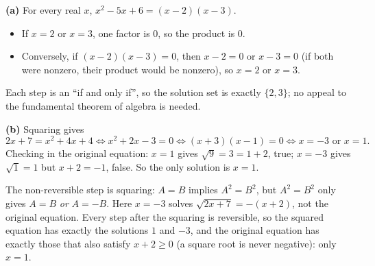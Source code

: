 \textbf{(a)} For every real $x$, $x^2-5x+6=(x-2)(x-3)$.
\begin{itemize}
\item If $x=2$ or $x=3$, one factor is $0$, so the product is $0$.
\item Conversely, if $(x-2)(x-3)=0$, then $x-2=0$ or $x-3=0$ (if both were nonzero, their product would be nonzero), so $x=2$ or $x=3$.
\end{itemize}
Each step is an ``if and only if'', so the solution set is exactly $\{2,3\}$; no appeal to the fundamental theorem of algebra is needed.

\textbf{(b)} Squaring gives
\[2x+7=x^2+4x+4\iff x^2+2x-3=0\iff(x+3)(x-1)=0\iff x=-3\text{ or }x=1.\]
Checking in the original equation: $x=1$ gives $\sqrt9=3=1+2$, true; $x=-3$ gives $\sqrt1=1$ but $x+2=-1$, false. So the only solution is $\boxed{x=1}$.

The non-reversible step is squaring: $A=B$ implies $A^2=B^2$, but $A^2=B^2$ only gives $A=B$ \emph{or} $A=-B$. Here $x=-3$ solves $\sqrt{2x+7}=-(x+2)$, not the original equation. Every step after the squaring is reversible, so the squared equation has exactly the solutions $1$ and $-3$, and the original equation has exactly those that also satisfy $x+2\ge0$ (a square root is never negative): only $x=1$.
